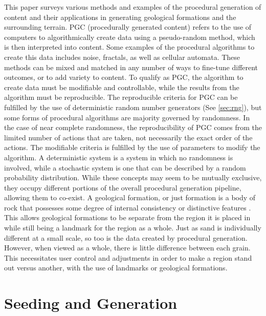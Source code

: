 \documentclass[10pt]{report}
\begin{document}
		This paper surveys various methods and examples of the procedural generation of content and their applications in generating geological formations and the surrounding terrain. PGC (procedurally generated content) refers to the use of computers to algorithmically create data using a pseudo-random method, which is then interpreted into content. Some examples of the procedural algorithms to create this data includes noise, fractals, as well as cellular automata. These methods can be mixed and matched in any number of ways to fine-tune different outcomes, or to add variety to content. To qualify as PGC, the algorithm to create data must be modifiable and controllable, while the results from the algorithm must be reproducible. The reproducible criteria for PGC can be fulfilled by the use of deterministic random number generators (See \autoref{sec:rng}), but some forms of procedural algorithms are majority governed by randomness. In the case of near complete randomness, the reproducibility of PGC comes from the limited number of actions that are taken, not necessarily the exact order of the actions. The modifiable criteria is fulfilled by the use of parameters to modify the algorithm. A deterministic system is a system in which no randomness is involved, while a stochastic system is one that can be described by a random probability distribution. While these concepts may seem to be mutually exclusive, they occupy different portions of the overall procedural generation pipeline, allowing them to co-exist. A geological formation, or just formation is a body of rock that possesses some degree of internal consistency or distinctive features \cite{2005}. This allows geological formations to be separate from the region it is placed in while still being a landmark for the region as a whole. Just as sand is individually different at a small scale, so too is the data created by procedural generation. However, when viewed as a whole, there is little difference between each grain. This necessitates user control and adjustments in order to make a region stand out versus another, with the use of landmarks or geological formations.
		
		\section{Seeding and Generation} \label{sec:rng}
		
\end{document}
